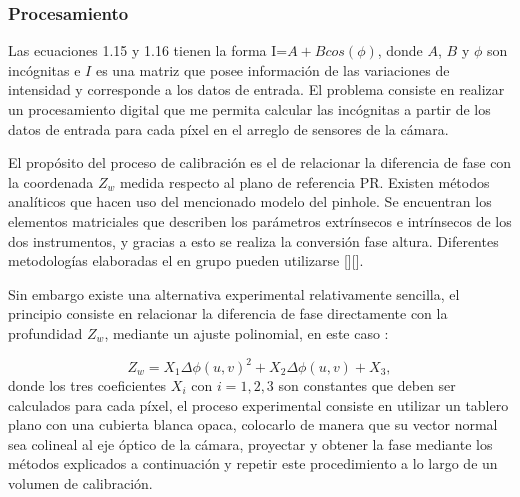 \documentclass[UTF8]{article}
\begin{document}
\subsubsection{Procesamiento}


Las ecuaciones 1.15 y 1.16 tienen la forma I=$A+Bcos(\phi)$, donde $A$, $B$ y $\phi$ son incógnitas e $I$ es una matriz que posee información de las variaciones de intensidad y corresponde a los datos de entrada. El problema consiste en realizar un procesamiento digital que me permita calcular las incógnitas a partir de los datos de entrada para cada píxel en el arreglo de sensores de la cámara.
\medskip

El propósito del proceso de calibración es el de relacionar la diferencia de fase con la coordenada $Z_{w}$ medida respecto al plano de referencia PR.  Existen métodos analíticos que hacen uso del mencionado modelo del pinhole. Se encuentran los elementos matriciales que describen los parámetros extrínsecos e intrínsecos de los dos instrumentos, y gracias a esto se realiza la conversión fase altura. Diferentes metodologías elaboradas el en grupo pueden utilizarse [][].
\medskip

Sin embargo existe una alternativa experimental relativamente sencilla, el principio consiste en relacionar la diferencia de fase directamente con la profundidad $Z_{w}$, mediante un ajuste polinomial, en este caso : 
\medskip

\begin{equation}
    Z_{w} = X_{1}\Delta\phi(u,v)^2 + X_{2}\Delta\phi(u,v)+ X_{3},
\end{equation}
donde los tres coeficientes $X_{i}$ con $i=1,2,3$ son constantes que deben ser calculados para cada píxel, el proceso experimental consiste en utilizar un tablero plano con una cubierta blanca opaca, colocarlo de manera que su vector normal sea colineal al eje óptico de la cámara, proyectar y obtener la fase mediante los métodos explicados a continuación y repetir este procedimiento a lo largo de un volumen de calibración.
\medskip
\end{document}
